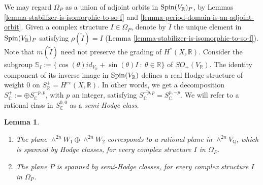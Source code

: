 \documentclass[12pt]{amsart}
\numberwithin{equation}{subsection}
\theoremstyle{plain}
\newtheorem{lem}[thm]{Lemma}
\theoremstyle{definition}
\newcommand{\CC}{{\mathbb C}}
\newcommand{\QQ}{{\mathbb Q}}
\newcommand{\RR}{{\mathbb R}}
\newcommand{\Spin}{{\rm Spin}}
\begin{document}
We may regard $\Omega_P$ as a union of adjoint orbits in $\Spin(V_\RR)_P$, by Lemmas \ref{lemma-stabilizer-is-isomorphic-to-so-f} and \ref{lemma-period-domain-is-an-adjoint-orbit}.
Given a complex structure $I\in\Omega_P$, denote by $\tilde{I}$ the unique element in $\Spin(V_\RR)_P$ satisfying $\rho(\tilde{I})=I$ (Lemma \ref{lemma-stabilizer-is-isomorphic-to-so-f}). Note that $m(\tilde{I})$ need not preserve the grading of $H^*(X,\RR)$.
Consider the subgroup ${\mathbb S}_I:=\{\cos(\theta)id_{V_\RR}+\sin(\theta)I \ : \ \theta\in\RR\}$ of $SO_+(V_\RR)$. The identity component of its inverse image in
 $\Spin(V_\RR)$ defines a real Hodge structure of weight $0$ on $S_\RR^+=H^{ev}(X,\RR)$. In other words, we get a decomposition $S_\CC^+:=\oplus S_\CC^{-p,p}$, with $p$ an integer, satisfying 
$\overline{S^{-p,p}_\CC}=S^{p,-p}_\CC.$ 
We will refer to a rational class in $S^{0,0}_\CC$ as a {\em semi-Hodge class}.

\begin{lem}
\label{lemma-Hodge-Weil-classes-remain-of-Hodge-type-for-all-I-in-Omega-P}
\begin{enumerate}
\item
\label{lemma-item-HW-consists-of-Hodge-classes-for-I-in-Omega-P}
The plane $\wedge^{2n}W_1\oplus\wedge^{2n}W_2$ corresponds to a rational plane in $\wedge^{2n}V_\QQ$, which is spanned by Hodge classes, for every complex structure $I$ in $\Omega_P$. 
\item
\label{lemma-item-P-consists-of-Hodge-classes-for-I-in-Omega-P}
The plane $P$ is spanned by semi-Hodge classes, for every complex structure $I$ in $\Omega_P$. 
\end{enumerate}
\end{lem}
\end{document}
